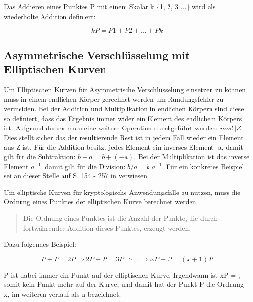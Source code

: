 		Das Addieren eines Punktes P mit einem Skalar k \myin \{1, 2, 3 ...\} wird als wiederholte Addition definiert:
		
		\begin{displaymath}
			kP = P1 + P2 + ... + Pk
		\end{displaymath}
		
	\subsection{Asymmetrische Verschlüsselung mit Elliptischen Kurven}
		Um Elliptischen Kurven für Asymmetrische Verschlüsselung einsetzen zu können muss in einem endlichen Körper gerechnet werden um Rundungsfehler zu vermeiden. Bei der Addition und Multiplikation in endlichen Körpern sind diese so definiert, dass das Ergebnis immer wider ein Element des endlichem Körpers ist. Aufgrund dessen muss eine weitere Operation durchgeführt werden: $mod~|Z|$. Dies stellt sicher das der resultierende Rest ist in jedem Fall wieder ein Element aus Z ist. Für die Addition besitzt jedes Element ein inverses Element -a, damit gilt für die Subtraktion: $b - a = b + (-a)$. Bei der Multiplikation ist das inverse Element $a^{-1}$, damit gilt für die Division: $b / a = b$ \mycdot $a^{-1}$. Für ein konkretes Beispiel sei an dieser Stelle auf S. 154 - 257 in \cite{Information:und:Kommunikation} verwiesen.
		
		Um elliptische Kurven für kryptologische Anwendungsfälle zu nutzen, muss die Ordnung eines Punktes der elliptischen Kurve berechnet werden.
		
		\begin{quote}
			\begin{defi}
				Die Ordnung eines Punktes ist die Anzahl der Punkte, die durch fortwährender Addition dieses Punktes, erzeugt werden.\cite{Information:und:Kommunikation}
			\end{defi}
		\end{quote}
		
		Dazu folgendes Beispiel:
		
		\begin{displaymath}
			P + P = 2P \Rightarrow 2P +P = 3P \Rightarrow ... \Rightarrow xP + P = (x+1)P
		\end{displaymath}
				
		P ist dabei immer ein Punkt auf der elliptischen Kurve. Irgendwann ist xP = \myInfty, somit kein Punkt mehr auf der Kurve, und damit hat der Punkt P die Ordnung x, im weiteren verlauf als n bezeichnet.
		
